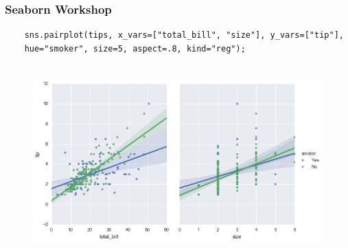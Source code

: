 \documentclass{beamer}
\begin{document}
\begin{frame}[fragile]
	\frametitle{Seaborn Workshop}
	\begin{verbatim}
	sns.pairplot(tips, x_vars=["total_bill", "size"], y_vars=["tip"],
	hue="smoker", size=5, aspect=.8, kind="reg");
	
	\end{verbatim}
	\begin{figure}
		\centering
		\includegraphics[width=0.8\linewidth]{images/regression_55_0}
	\end{figure}
\end{frame}
\end{document}
